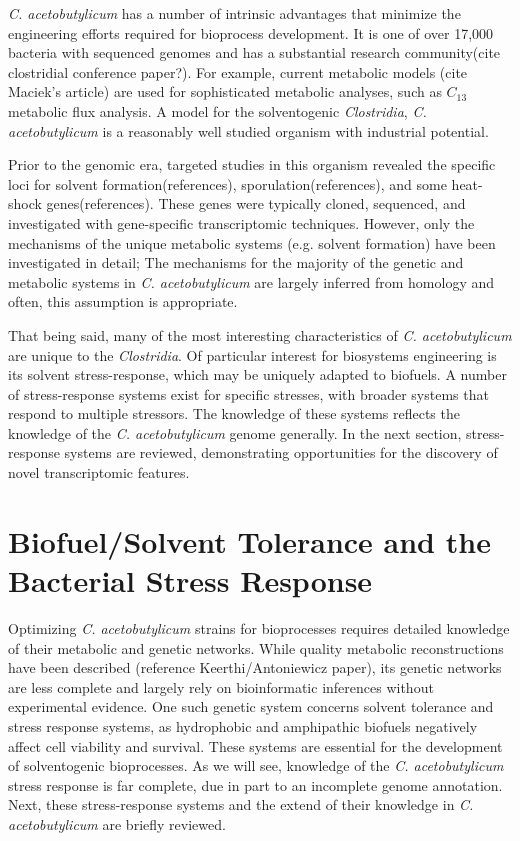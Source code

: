 \textit{C. acetobutylicum} has a number of intrinsic advantages that minimize the engineering efforts required for bioprocess development. It is one of over 17,000 bacteria with sequenced genomes\cite{89,90,91} and has a substantial research community(cite clostridial conference paper?). For example, current metabolic models (cite Maciek's article) are used for sophisticated metabolic analyses, such as $C_{13}$ metabolic flux analysis. A model for the solventogenic \textit{Clostridia}, \textit{C. acetobutylicum} is a reasonably well studied organism with industrial potential.

Prior to the genomic era, targeted studies in this organism revealed the specific loci for solvent formation(references), sporulation(references), and some heat-shock genes(references). These genes were typically cloned, sequenced, and  investigated with gene-specific transcriptomic techniques. However, only the mechanisms of the unique metabolic systems (e.g. solvent formation) have been investigated in detail; The mechanisms for the majority of the genetic and metabolic systems in \textit{C. acetobutylicum} are largely inferred from homology and often, this assumption is appropriate. 

That being said, many of the most interesting characteristics of \textit{C. acetobutylicum} are unique to the \textit{Clostridia}. Of particular interest for biosystems engineering is its solvent stress-response, which may be uniquely adapted to biofuels. A number of stress-response systems exist for specific stresses, with broader systems that respond to multiple stressors. The knowledge of these systems reflects the knowledge of the \textit{C. acetobutylicum} genome generally. In the next section, stress-response systems are reviewed, demonstrating opportunities for the discovery of novel transcriptomic features.

\section{Biofuel/Solvent Tolerance and the Bacterial Stress Response}



Optimizing \textit{C. acetobutylicum} strains for bioprocesses requires detailed knowledge of their metabolic and genetic networks. While quality metabolic reconstructions have been described (reference Keerthi/Antoniewicz paper), its genetic networks are less complete and largely rely on bioinformatic inferences without experimental evidence. One such genetic system concerns solvent tolerance and stress response systems, as hydrophobic and amphipathic biofuels negatively affect cell viability and survival. These systems are essential for the development of solventogenic bioprocesses. As we will see, knowledge of the \textit{C. acetobutylicum} stress response is far complete, due in part to an incomplete genome annotation. Next, these stress-response systems and the extend of their knowledge in \textit{C. acetobutylicum} are briefly reviewed.



